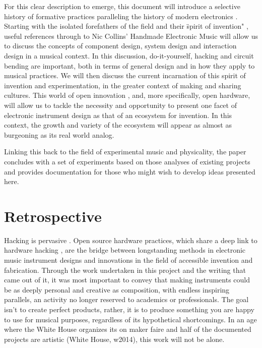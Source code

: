 	For this clear description to emerge, this document will introduce a selective history of formative practices paralleling the history of modern electronics \cite{holmes2002}. Starting with the isolated forefathers of the field and their \"spirit of invention" \cite{dunn2002}, useful references through to Nic Collins' Handmade Electronic Music \cite{collins2006} will allow us to discuss the concepts of component design, system design and interaction design in a musical context. In this discussion, do-it-yourself, hacking and circuit bending are important, both in terms of general design and in how they apply to musical practices. We will then discuss the current incarnation of this spirit of invention and experimentation, in the greater context of making and sharing cultures. This world of open innovation \cite{christensen2005}, and, more specifically, open hardware, will allow us to tackle the necessity and opportunity to present one facet of electronic instrument design as that of an ecosystem for invention. In this context, the growth and variety of the ecosystem will appear as almost as burgeoning as its real world analog. 

	Linking this back to the field of experimental music and physicality, the paper concludes with a set of experiments based on those analyses of existing projects and provides documentation for those who might wish to develop ideas presented here.

\section{Retrospective}

Hacking is pervasive \cite{paradiso2008}. Open source hardware practices, which share a deep link to hardware hacking \cite{williams2012}, are the bridge between longstanding methods in electronic music instrument designs and innovations in the field of accessible invention and fabrication. Through the work undertaken in this project and the writing that came out of it, it was most important to convey that making instruments could be as deeply personal and creative as composition, with endless inspiring parallels, an activity no longer reserved to academics or professionals. The goal isn't to create perfect products, rather, it is to produce something you are happy to use for musical purposes, regardless of its hypothetical shortcomings. In an age where the White House organizes its on maker faire and half of the documented projects are artistic (White House, w2014), this work will not be alone.
	

